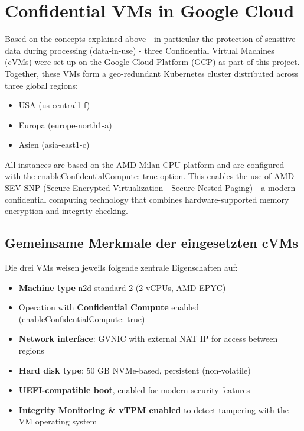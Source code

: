 \section{Confidential VMs in Google Cloud}

Based on the concepts explained above - in particular the protection of sensitive data during processing (data-in-use) - three Confidential Virtual Machines (cVMs) were set up on the Google Cloud Platform (GCP) as part of this project. Together, these VMs form a geo-redundant Kubernetes cluster distributed across three global regions:

\begin{itemize}
  \item USA (us-central1-f)
  \item Europa (europe-north1-a)
  \item Asien (asia-east1-c)
\end{itemize}

All instances are based on the AMD Milan CPU platform and are configured with the enableConfidentialCompute: true option. This enables the use of AMD SEV-SNP (Secure Encrypted Virtualization - Secure Nested Paging) - a modern confidential computing technology that combines hardware-supported memory encryption and integrity checking.

\subsection{Gemeinsame Merkmale der eingesetzten cVMs}

Die drei VMs weisen jeweils folgende zentrale Eigenschaften auf:

\begin{itemize}
  \item \textbf{Machine type} n2d-standard-2 (2 vCPUs, AMD EPYC)
\item Operation with \textbf{Confidential Compute} enabled (enableConfidentialCompute: true)
\item \textbf{Network interface}: GVNIC with external NAT IP for access between regions
\item \textbf{Hard disk type}: 50 GB NVMe-based, persistent (non-volatile)  
\item \textbf{UEFI-compatible boot}, enabled for modern security features
\item \textbf{Integrity Monitoring \& vTPM enabled} to detect tampering with the VM operating system
\end{itemize}

